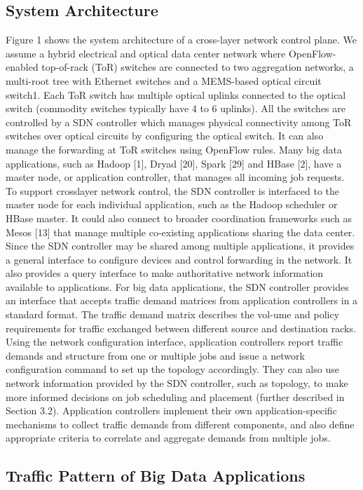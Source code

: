 \documentclass[runningheads,a4paper]{llncs}
\begin{document}
\subsection{System Architecture}
Figure 1 shows the system architecture of a cross-layer network control plane. We assume a hybrid electrical and optical data center network where OpenFlow-enabled top-of-rack (ToR) switches are connected to two aggregation networks, a multi-root tree with Ethernet switches and a MEMS-based optical circuit switch1. Each ToR switch has multiple optical uplinks connected to the optical switch (commodity switches typically have 4 to 6 uplinks). All the switches are controlled by a SDN controller which manages physical connectivity among ToR switches over optical circuits by configuring the optical switch. It can also manage the forwarding at ToR switches using OpenFlow rules.
Many big data applications, such as Hadoop [1], Dryad [20], Spark [29] and HBase [2], have a master node, or application controller, that manages all incoming job requests. To support crosslayer network control, the SDN controller is interfaced to the master node for each individual application, such as the Hadoop scheduler or HBase master. It could also connect to broader coordination frameworks such as Mesos [13] that manage multiple co-existing applications sharing the data center.
Since the SDN controller may be shared among multiple applications, it provides a general interface to configure devices and control forwarding in the network. It also provides a query interface to make authoritative network information available to applications. For big data applications, the SDN controller provides an interface that accepts traffic demand matrices from application controllers in a standard format. The traffic demand matrix describes the vol-ume and policy requirements for traffic exchanged between different source and destination racks.
Using the network configuration interface, application controllers report traffic demands and structure from one or multiple jobs and issue a network configuration command to set up the topology accordingly. They can also use network information provided by the SDN controller, such as topology, to make more informed decisions on job scheduling and placement (further described in Section 3.2). Application controllers implement their own application-specific mechanisms to collect traffic demands from different components, and also define appropriate criteria to correlate and aggregate demands from multiple jobs.

\subsection{Traffic Pattern of Big Data Applications}
\end{document}
